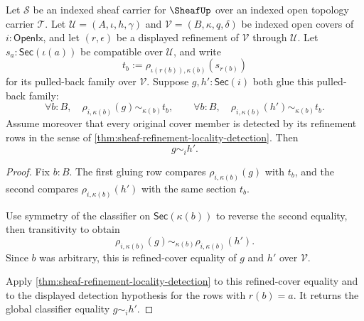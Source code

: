 \begin{theorem}
\label{thm:sheaf-refined-cover-gluing-uniqueness}
Let $\mathcal{S}$ be an indexed sheaf carrier for $\SheafUp$ over an indexed open topology carrier $\mathcal{T}$. Let $\mathcal{U}=(A,\iota,h,\gamma)$ and $\mathcal{V}=(B,\kappa,q,\delta)$ be indexed open covers of $i:\mathsf{OpenIx}$, and let $(r,\epsilon)$ be a displayed refinement of $\mathcal{V}$ through $\mathcal{U}$. Let $s_a:\mathsf{Sec}(\iota(a))$ be compatible over $\mathcal{U}$, and write
$$
t_b:=\rho_{\iota(r(b)),\kappa(b)}(s_{r(b)})
$$
for its pulled-back family over $\mathcal{V}$. Suppose $g,h':\mathsf{Sec}(i)$ both glue this pulled-back family:
$$
\forall b:B,\quad \rho_{i,\kappa(b)}(g)\sim_{\kappa(b)}t_b,
\qquad
\forall b:B,\quad \rho_{i,\kappa(b)}(h')\sim_{\kappa(b)}t_b.
$$
Assume moreover that every original cover member is detected by its refinement rows in the sense of \autoref{thm:sheaf-refinement-locality-detection}. Then
$$
g\sim_i h'.
$$
\end{theorem}
\begin{proof}
Fix $b:B$. The first gluing row compares $\rho_{i,\kappa(b)}(g)$ with $t_b$, and the second compares $\rho_{i,\kappa(b)}(h')$ with the same section $t_b$.

Use symmetry of the classifier on $\mathsf{Sec}(\kappa(b))$ to reverse the second equality, then transitivity to obtain
$$
\rho_{i,\kappa(b)}(g)\sim_{\kappa(b)}\rho_{i,\kappa(b)}(h').
$$
Since $b$ was arbitrary, this is refined-cover equality of $g$ and $h'$ over $\mathcal{V}$.

Apply \autoref{thm:sheaf-refinement-locality-detection} to this refined-cover equality and to the displayed detection hypothesis for the rows with $r(b)=a$. It returns the global classifier equality $g\sim_i h'$.
\end{proof}

